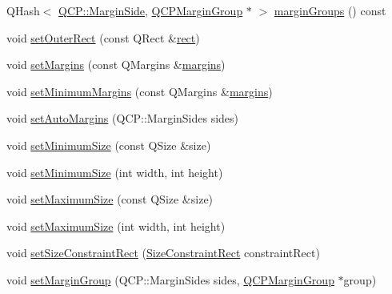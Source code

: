 \begin{DoxyCompactItemize}
\item 
Q\+Hash$<$ \mbox{\hyperlink{namespace_q_c_p_a7e487e3e2ccb62ab7771065bab7cae54}{Q\+C\+P\+::\+Margin\+Side}}, \mbox{\hyperlink{class_q_c_p_margin_group}{Q\+C\+P\+Margin\+Group}} $\ast$ $>$ \mbox{\hyperlink{class_q_c_p_layout_element_ac8d1139a81a1625860647e307ae2b733}{margin\+Groups}} () const
\item 
void \mbox{\hyperlink{class_q_c_p_layout_element_a38975ea13e36de8e53391ce41d94bc0f}{set\+Outer\+Rect}} (const Q\+Rect \&\mbox{\hyperlink{class_q_c_p_layout_element_a208effccfe2cca4a0eaf9393e60f2dd4}{rect}})
\item 
void \mbox{\hyperlink{class_q_c_p_layout_element_a8f450b1f3f992ad576fce2c63d8b79cf}{set\+Margins}} (const Q\+Margins \&\mbox{\hyperlink{class_q_c_p_layout_element_af4ac9450aa2d60863bf3a8ea0c940c9d}{margins}})
\item 
void \mbox{\hyperlink{class_q_c_p_layout_element_a0a8a17abc16b7923159fcc7608f94673}{set\+Minimum\+Margins}} (const Q\+Margins \&\mbox{\hyperlink{class_q_c_p_layout_element_af4ac9450aa2d60863bf3a8ea0c940c9d}{margins}})
\item 
void \mbox{\hyperlink{class_q_c_p_layout_element_accfda49994e3e6d51ed14504abf9d27d}{set\+Auto\+Margins}} (Q\+C\+P\+::\+Margin\+Sides sides)
\item 
void \mbox{\hyperlink{class_q_c_p_layout_element_a5dd29a3c8bc88440c97c06b67be7886b}{set\+Minimum\+Size}} (const Q\+Size \&size)
\item 
void \mbox{\hyperlink{class_q_c_p_layout_element_a8e0447614a0bf92de9a7304588c6b96e}{set\+Minimum\+Size}} (int width, int height)
\item 
void \mbox{\hyperlink{class_q_c_p_layout_element_a74eb5280a737ab44833d506db65efd95}{set\+Maximum\+Size}} (const Q\+Size \&size)
\item 
void \mbox{\hyperlink{class_q_c_p_layout_element_a03e0e9c48f230217c529b0819f832d84}{set\+Maximum\+Size}} (int width, int height)
\item 
void \mbox{\hyperlink{class_q_c_p_layout_element_a361666cdcc6fbfd37344cc44be746b0f}{set\+Size\+Constraint\+Rect}} (\mbox{\hyperlink{class_q_c_p_layout_element_a0afb3e5773529e4bd20e448f81be4d2a}{Size\+Constraint\+Rect}} constraint\+Rect)
\item 
void \mbox{\hyperlink{class_q_c_p_layout_element_a516e56f76b6bc100e8e71d329866847d}{set\+Margin\+Group}} (Q\+C\+P\+::\+Margin\+Sides sides, \mbox{\hyperlink{class_q_c_p_margin_group}{Q\+C\+P\+Margin\+Group}} $\ast$group)
\item 

\end{DoxyCompactItemize}

